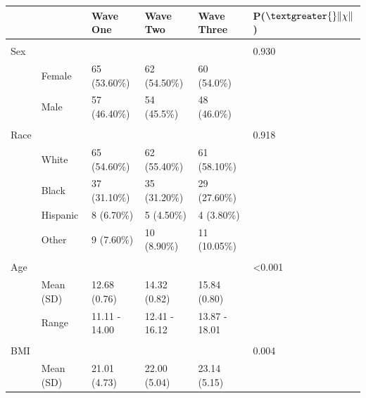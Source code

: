 \documentclass[utf8]{stylesheet}
\begin{document}
\begin{table}[h!]
\begin{tabular}{llllll}
                    &                 & Wave One         & Wave Two         & Wave Three       & P($\textgreater{}\|\chi\|$)       \\ \hline \\
Sex                 &                 &                  &                  &                  & 0.930                    \\
                    & Female          & 65 (53.60\%)     & 62 (54.50\%)     & 60 (54.0\%)      &                          \\
                    & Male            & 57 (46.40\%)     & 54 (45.5\%)      & 48 (46.0\%)      &                          \\ \hline \\
Race                &                 &                  &                  &                  & 0.918                    \\
                    & White           & 65 (54.60\%)      & 62 (55.40\%)      & 61 (58.10\%)      &                          \\
                    & Black           & 37 (31.10\%)      & 35 (31.20\%)      & 29 (27.60\%)      &                          \\
                    & Hispanic        & 8 (6.70\%)        & 5 (4.50\%)        & 4 (3.80\%)        &                          \\
                    & Other           & 9 (7.60\%)       & 10 (8.90\%)       & 11 (10.05\%)      &                          \\ \hline \\
Age        &                 &                  &                  &                  & \textless 0.001 \\
                    & Mean (SD)       & 12.68 (0.76)   & 14.32 (0.82)   & 15.84 (0.80)   &                          \\
                    & Range           & 11.11 - 14.00    & 12.41 - 16.12     & 13.87 - 18.01    &                          \\       \hline \\              
BMI        &                 &                  &                  &                  & 0.004           \\
                    & Mean (SD)       & 21.01 (4.73)   & 22.00 (5.04)   & 23.14 (5.15)   &                          \\

\end{tabular}
\end{table}
\end{document}
